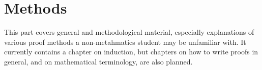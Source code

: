 \documentclass[../../include/open-logic-part]{subfiles}
\begin{document}
\part{Methods}

\begin{editorial}
  This part covers general and methodological material, especially
  explanations of various proof methods a non-metahmatics student may
  be unfamiliar with. It currently contains a chapter on induction,
  but chapters on how to write proofs in general, and on mathematical
  terminology, are also planned.
\end{editorial}


\OLEndPartHook
\end{document}
